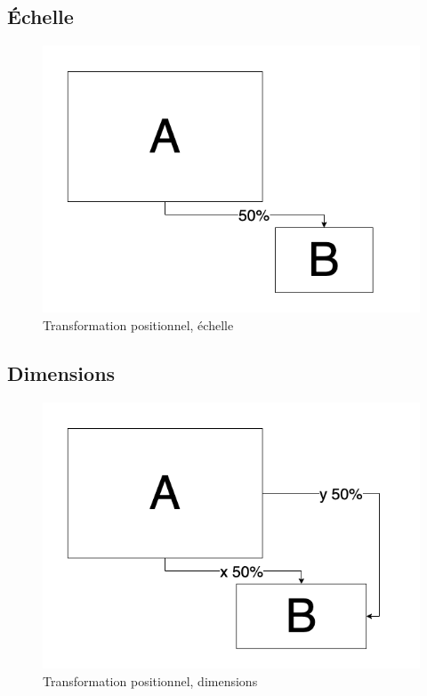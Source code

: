 \documentclass[
  french,
]{book}
\begin{document}
\hypertarget{uxe9chelle}{%
\subsection{Échelle}\label{uxe9chelle}}

\begin{figure}
\centering
\includegraphics{medias/traiter/figures/dia_transfogeo_echelle.png}
\caption{Transformation positionnel, échelle}
\end{figure}

\hypertarget{dimensions}{%
\subsection{Dimensions}\label{dimensions}}

\begin{figure}
\centering
\includegraphics{medias/traiter/figures/dia_transfogeo_dimensions.png}
\caption{Transformation positionnel, dimensions}
\end{figure}
\end{document}
